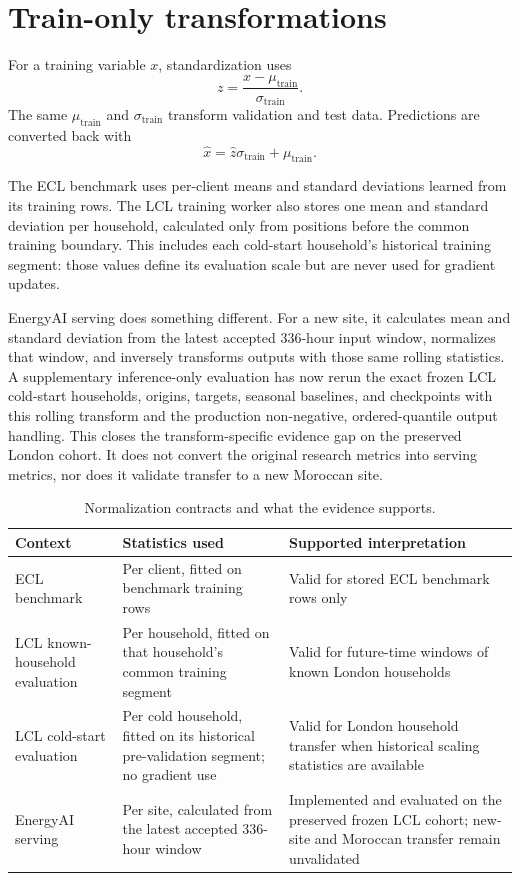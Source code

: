 \section{Train-only transformations}

For a training variable $x$, standardization uses
\begin{equation}
 z = \frac{x-\mu_{\mathrm{train}}}{\sigma_{\mathrm{train}}}.
\end{equation}
The same $\mu_{\mathrm{train}}$ and $\sigma_{\mathrm{train}}$ transform validation and test data. Predictions are converted back with
\begin{equation}
 \hat x = \hat z\sigma_{\mathrm{train}} + \mu_{\mathrm{train}}.
\end{equation}

The ECL benchmark uses per-client means and standard deviations learned from its training rows. The LCL training worker also stores one mean and standard deviation per household, calculated only from positions before the common training boundary. This includes each cold-start household's historical training segment: those values define its evaluation scale but are never used for gradient updates.

EnergyAI serving does something different. For a new site, it calculates mean and standard deviation from the latest accepted 336-hour input window, normalizes that window, and inversely transforms outputs with those same rolling statistics. A supplementary inference-only evaluation has now rerun the exact frozen LCL cold-start households, origins, targets, seasonal baselines, and checkpoints with this rolling transform and the production non-negative, ordered-quantile output handling. This closes the transform-specific evidence gap on the preserved London cohort. It does not convert the original research metrics into serving metrics, nor does it validate transfer to a new Moroccan site.

\begin{table}[H]
\centering
\caption{Normalization contracts and what the evidence supports.}
\label{tab:normalizationcontracts}
\begin{tabularx}{\textwidth}{p{}p{}Y}
\toprule
Context & Statistics used & Supported interpretation \\
\midrule
ECL benchmark & Per client, fitted on benchmark training rows & Valid for stored ECL benchmark rows only \\
LCL known-household evaluation & Per household, fitted on that household's common training segment & Valid for future-time windows of known London households \\
LCL cold-start evaluation & Per cold household, fitted on its historical pre-validation segment; no gradient use & Valid for London household transfer when historical scaling statistics are available \\
EnergyAI serving & Per site, calculated from the latest accepted 336-hour window & Implemented and evaluated on the preserved frozen LCL cohort; new-site and Moroccan transfer remain unvalidated \\
\bottomrule
\end{tabularx}
\end{table}

